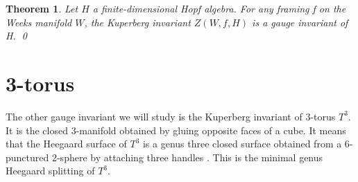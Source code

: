 \documentclass[12pt]{amsart}
\newtheorem{theorem}{Theorem}
\begin{document}
\begin{theorem}\label{weeksthm}
Let $H$ a finite-dimensional Hopf algebra. For any framing f on the Weeks manifold $W$, the Kuperberg invariant $Z(W, f, H)$ is a gauge
invariant of H. \qed
\end{theorem}




\section{3-torus}

The other gauge invariant we will study is the Kuperberg invariant of 3-torus $T^3$. It is the closed 3-manifold obtained by gluing opposite faces of a cube. It means that the Heegaard surface of $T^3$ is a genus three closed surface obtained from a 6-punctured 2-sphere by attaching three handles \cite{GS99}. This is the minimal genus Heegaard splitting of $T^3$.   
\end{document}
